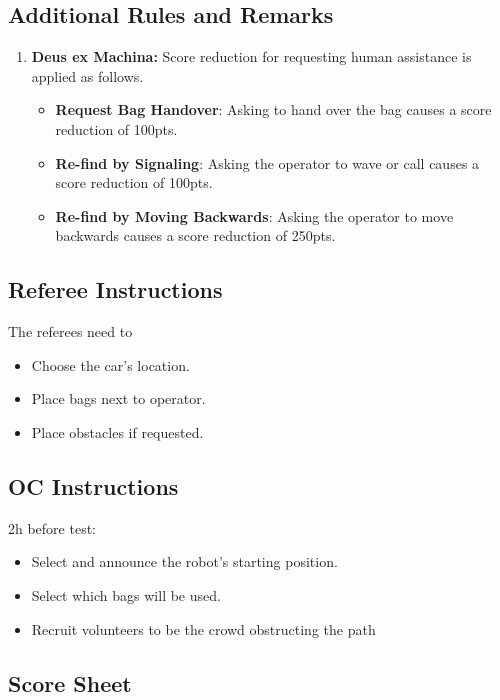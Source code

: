 \subsection*{Additional Rules and Remarks}
\begin{enumerate}[nosep]
	\item \textbf{Deus ex Machina:} Score reduction for requesting human assistance is applied as follows.
	
	\begin{itemize}[nosep]
		\item \textbf{Request Bag Handover}: Asking to hand over the bag causes a score reduction of 100pts.
	
		\item \textbf{Re-find by Signaling}: Asking the operator to wave or call causes a score reduction of 100pts.
	
		\item \textbf{Re-find by Moving Backwards}: Asking the operator to move backwards causes a score reduction of 250pts.
	\end{itemize}
\end{enumerate}

\newpage

\subsection*{Referee Instructions}
The referees need to
\begin{itemize}[nosep]
	\item Choose the car's location.
	\item Place bags next to operator.
	\item Place obstacles if requested.
\end{itemize}


\subsection*{OC Instructions}
2h before test:
\begin{itemize}[nosep]
	\item Select and announce the robot's starting position.
	\item Select which bags will be used.
	\item Recruit volunteers to be the crowd obstructing the path
\end{itemize}





\subsection*{Score Sheet}

